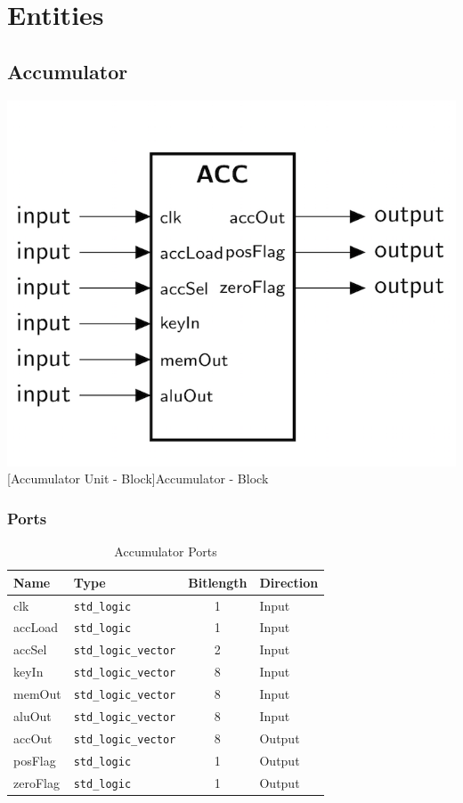 \section{Entities}


\subsection{Accumulator}

\vspace{1em}
\begin{minipage}{\linewidth}
    \centering
    \includegraphics[width=0.4\linewidth]{images/ACC.png}
    [Accumulator Unit - Block]{Accumulator - Block}
    \label{fig:acc_block}
\end{minipage}

\subsubsection{Ports}

\vspace{1em}
\begin{table}[!h]
	\centering
	\begin{tabular}{|l|l|c|l|}
		\hline
		\textbf{Name} & \textbf{Type} & \textbf{Bitlength} & \textbf{Direction}\\
		\hline
		clk & \texttt{std\_logic} & 1 & Input \\
		\hline
		accLoad & \texttt{std\_logic} & 1 & Input \\
		\hline
		accSel & \texttt{std\_logic\_vector} & 2 & Input \\
		\hline
		keyIn & \texttt{std\_logic\_vector} & 8 & Input \\
		\hline
		memOut & \texttt{std\_logic\_vector} & 8 & Input \\
		\hline
		aluOut & \texttt{std\_logic\_vector} & 8 & Input \\
		\hline
		accOut & \texttt{std\_logic\_vector} & 8 & Output \\
		\hline
		posFlag & \texttt{std\_logic} & 1 & Output \\
		\hline
		zeroFlag & \texttt{std\_logic} & 1 & Output \\
		\hline
	\end{tabular}
	\caption{Accumulator Ports}
	\label{tab:acc_ports}
\end{table}

